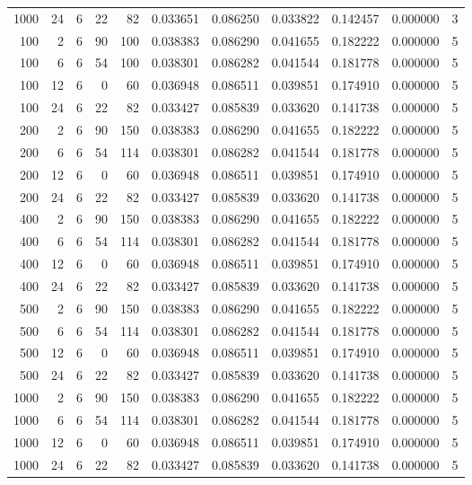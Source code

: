 \begin{table}
\begin{tabular}{rrrrrrrrrrr}
1000 & 24 & 6 & 22 & 82 & 0.033651 & 0.086250 & 0.033822 & 0.142457 & 0.000000 & 3 \\
100 & 2 & 6 & 90 & 100 & 0.038383 & 0.086290 & 0.041655 & 0.182222 & 0.000000 & 5 \\
100 & 6 & 6 & 54 & 100 & 0.038301 & 0.086282 & 0.041544 & 0.181778 & 0.000000 & 5 \\
100 & 12 & 6 & 0 & 60 & 0.036948 & 0.086511 & 0.039851 & 0.174910 & 0.000000 & 5 \\
100 & 24 & 6 & 22 & 82 & 0.033427 & 0.085839 & 0.033620 & 0.141738 & 0.000000 & 5 \\
200 & 2 & 6 & 90 & 150 & 0.038383 & 0.086290 & 0.041655 & 0.182222 & 0.000000 & 5 \\
200 & 6 & 6 & 54 & 114 & 0.038301 & 0.086282 & 0.041544 & 0.181778 & 0.000000 & 5 \\
200 & 12 & 6 & 0 & 60 & 0.036948 & 0.086511 & 0.039851 & 0.174910 & 0.000000 & 5 \\
200 & 24 & 6 & 22 & 82 & 0.033427 & 0.085839 & 0.033620 & 0.141738 & 0.000000 & 5 \\
400 & 2 & 6 & 90 & 150 & 0.038383 & 0.086290 & 0.041655 & 0.182222 & 0.000000 & 5 \\
400 & 6 & 6 & 54 & 114 & 0.038301 & 0.086282 & 0.041544 & 0.181778 & 0.000000 & 5 \\
400 & 12 & 6 & 0 & 60 & 0.036948 & 0.086511 & 0.039851 & 0.174910 & 0.000000 & 5 \\
400 & 24 & 6 & 22 & 82 & 0.033427 & 0.085839 & 0.033620 & 0.141738 & 0.000000 & 5 \\
500 & 2 & 6 & 90 & 150 & 0.038383 & 0.086290 & 0.041655 & 0.182222 & 0.000000 & 5 \\
500 & 6 & 6 & 54 & 114 & 0.038301 & 0.086282 & 0.041544 & 0.181778 & 0.000000 & 5 \\
500 & 12 & 6 & 0 & 60 & 0.036948 & 0.086511 & 0.039851 & 0.174910 & 0.000000 & 5 \\
500 & 24 & 6 & 22 & 82 & 0.033427 & 0.085839 & 0.033620 & 0.141738 & 0.000000 & 5 \\
1000 & 2 & 6 & 90 & 150 & 0.038383 & 0.086290 & 0.041655 & 0.182222 & 0.000000 & 5 \\
1000 & 6 & 6 & 54 & 114 & 0.038301 & 0.086282 & 0.041544 & 0.181778 & 0.000000 & 5 \\
1000 & 12 & 6 & 0 & 60 & 0.036948 & 0.086511 & 0.039851 & 0.174910 & 0.000000 & 5 \\
1000 & 24 & 6 & 22 & 82 & 0.033427 & 0.085839 & 0.033620 & 0.141738 & 0.000000 & 5 \\

\end{tabular}
\end{table}
